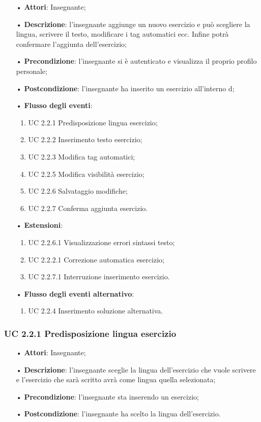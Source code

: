 \begin{itemize}
	\item[•] \textbf{Attori}: Insegnante;
	\item[•] \textbf{Descrizione}: l'insegnante aggiunge un nuovo esercizio e può scegliere la lingua, scrivere il testo, modificare i tag automatici ecc. Infine potrà confermare l'aggiunta dell'esercizio;
	\item[•] \textbf{Precondizione}: l'insegnante si è autenticato e visualizza il proprio profilo personale;
	\item[•] \textbf{Postcondizione}: l'insegnante ha inserito un esercizio all'interno d;
	\item[•] \textbf{Flusso degli eventi}:
	\begin{enumerate}
		\item UC 2.2.1 Predisposizione lingua esercizio;
		\item UC 2.2.2 Inserimento testo esercizio;
		\item UC 2.2.3 Modifica tag automatici;

		\item UC 2.2.5 Modifica visibilità esercizio;
		\item UC 2.2.6 Salvataggio modifiche;
		\item UC 2.2.7 Conferma aggiunta esercizio.
	\end{enumerate}
	\item[•] \textbf{Estensioni}:	
	\begin{enumerate}
		\item UC 2.2.6.1 Visualizzazione errori sintassi testo;
		\item UC 2.2.2.1 Correzione automatica esercizio;
		\item UC 2.2.7.1 Interruzione inserimento esercizio.
	\end{enumerate}
	\item[•] \textbf{Flusso degli eventi alternativo}:
	\begin{enumerate}
		\item UC 2.2.4 Inserimento soluzione alternativa.
	\end{enumerate}
\end{itemize}

\subsubsection{UC 2.2.1 Predisposizione lingua esercizio}
\begin{itemize}
	\item[•] \textbf{Attori}: Insegnante;
	\item[•] \textbf{Descrizione}: l'insegnante sceglie la lingua dell'esercizio che vuole scrivere e l'esercizio che sarà scritto avrà come lingua quella selezionata;
	\item[•] \textbf{Precondizione}: l'insegnante sta inserendo un esercizio;
	\item[•] \textbf{Postcondizione}: l'insegnante ha scelto la lingua dell'esercizio.
\end{itemize}
